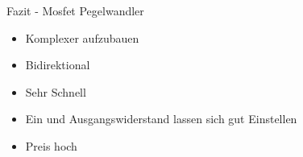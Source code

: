 
\begin{frame}[c]{Fazit - Mosfet Pegelwandler}

  \begin{itemize}
    \item Komplexer aufzubauen
    \item Bidirektional
    \item Sehr Schnell
    \item Ein und Ausgangswiderstand lassen sich gut Einstellen
    \item Preis hoch
  \end{itemize}

\end{frame}
